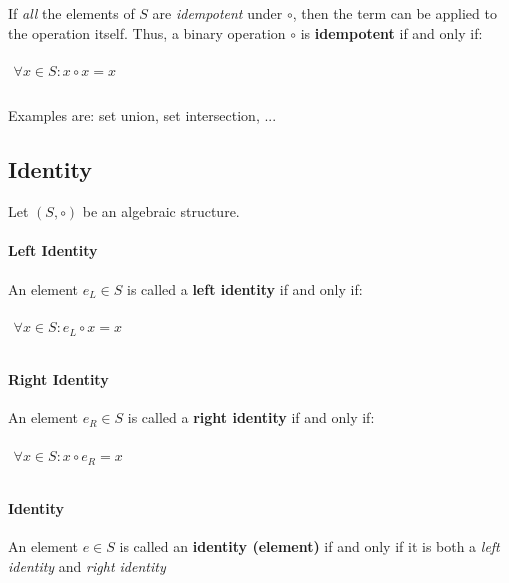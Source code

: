 If \textit{all} the elements of $S$ are \textit{idempotent} under
$\circ$, then the term can be applied to the operation itself. Thus, a
binary operation $\circ$ is \textbf{idempotent} if and only if:

\begin{math}
  \begin{array}{c}
    \\
    \forall x \in S: x \circ x = x\\
    \\
  \end{array}
\end{math}

Examples are: set union, set intersection, ...



\subsection{Identity}
\label{sec:identity}

Let $(S, \circ)$ be an algebraic structure.


\paragraph{Left Identity}
An element $e_L \in S$ is called a \textbf{left identity} if and only
if:

\begin{math}
  \begin{array}{c}
    \\
    \forall x \in S: e_L \circ x = x\\
    \\
  \end{array}
\end{math}

\paragraph{Right Identity}
An element $e_R \in S$ is called a \textbf{right identity} if and only
if:

\begin{math}
  \begin{array}{c}
    \\
    \forall x \in S: x \circ e_R = x\\
    \\
  \end{array}
\end{math}


\paragraph{Identity}
An element $e \in S$ is called an \textbf{identity (element)} if and
only if it is both a \textit{left identity} and \textit{right
  identity}

